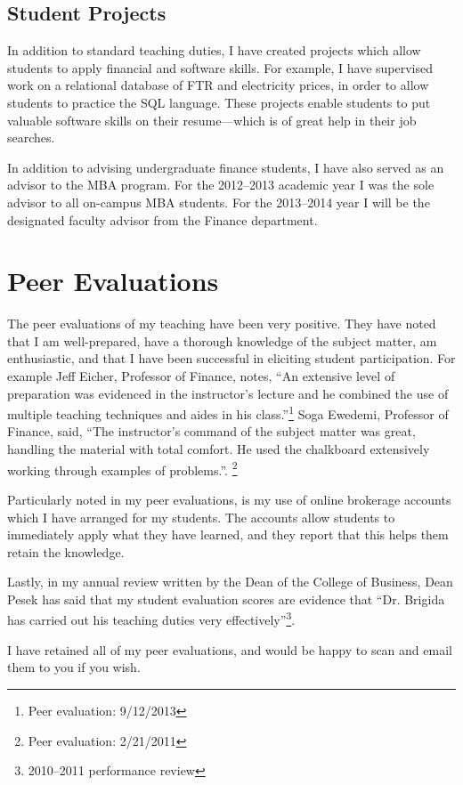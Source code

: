\documentclass[12pt]{article}
\begin{document}
\subsection{Student Projects}

In addition to standard teaching duties, I have created projects which allow students to apply financial and software skills.  For example, I have supervised work on a relational database of FTR and electricity prices, in order to allow students to practice the SQL language.  These projects enable students to put valuable software skills on their resume---which is of great help in their job searches.  

In addition to advising undergraduate finance students, I have also served as an advisor to the MBA program.  For the 2012--2013 academic year I was the sole advisor to all on-campus MBA students.  For the 2013--2014 year I will be the designated faculty advisor from the Finance department.

\section{Peer Evaluations}
The peer evaluations of my teaching have been very positive.  They have noted that I am well-prepared, have a thorough knowledge of the subject matter, am enthusiastic, and that I have been successful in eliciting student participation.  For example Jeff Eicher, Professor of Finance, notes, ``An extensive level of preparation was evidenced in the instructor's lecture and he combined the use of multiple teaching techniques and aides in his class.''\footnote{Peer evaluation: 9/12/2013} Soga Ewedemi, Professor of Finance, said, ``The instructor's command of the subject matter was great, handling the material with total comfort. He used the chalkboard extensively working through examples of problems.''. \footnote{Peer evaluation: 2/21/2011}

Particularly noted in my peer evaluations, is my use of online brokerage accounts which I have arranged for my students.  The accounts allow students to immediately apply what they have learned, and they report that this helps them retain the knowledge.

Lastly, in my annual review written by the Dean of the College of Business, Dean Pesek has said that my student evaluation scores are evidence that ``Dr. Brigida has carried out his teaching duties very effectively''\footnote{2010--2011 performance review}.  

I have retained all of my peer evaluations, and would be happy to scan and email them to you if you wish.
\end{document}
